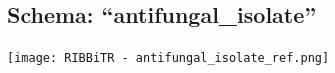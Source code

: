 \documentclass[
]{article}
\begin{document}
\hypertarget{schema-antifungal_isolate}{%
\subsection{Schema:
``antifungal\_isolate''}\label{schema-antifungal_isolate}}

\texttt{[image: RIBBiTR - antifungal\_isolate\_ref.png]}
\end{document}
